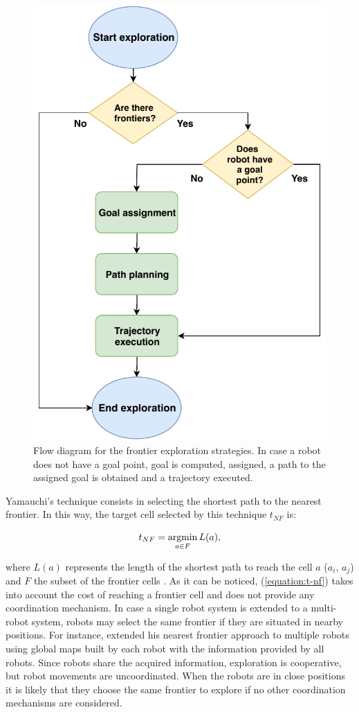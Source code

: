 \begin{figure}[t!]
	\centering\includegraphics[width=0.85\columnwidth]{./pictures/flow_diagram.pdf}
	\caption{Flow diagram for the frontier exploration strategies. In case a robot does not have a goal point, goal is computed, assigned, a path to the assigned goal is obtained and a trajectory executed.}
	\label{fig:flow_diagram}
\end{figure}

Yamauchi's technique consists in selecting the shortest path to the nearest frontier. In this way, the target cell selected by this technique $t_{NF}$ is:

\begin{equation}
t_{NF} = \operatorname*{argmin}_{a \in F} L(a), 
\label{equation:t-nf}
\end{equation}

where $L(a)$ represents the length of the shortest path to reach the cell $a$ ($a_{i}$, $a_{j}$) and $F$ the subset of the frontier cells \cite{Julia2012}. As it can be noticed, (\ref{equation:t-nf}) takes into account the cost of reaching a frontier cell and does not provide any coordination mechanism. In case a single robot system is extended to a multi-robot system, robots may select the same frontier if they are situated in nearby positions. For instance, \cite{Yamauchi1998} extended his nearest frontier approach to multiple robots using global maps built by each robot with the information provided by all robots. Since robots share the acquired information, exploration is cooperative, but robot movements are uncoordinated. When the robots are in close positions it is likely that they choose the same frontier to explore if no other coordination mechanisms are considered.

